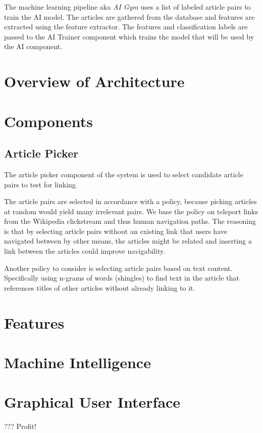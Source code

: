 The machine learning pipeline aka \textit{AI Gym\texttrademark} uses a list of labeled article pairs to train the AI model. The articles are gathered from the database and features are extracted using the feature extractor. The features and classification labels are passed to the AI Trainer component which trains the model that will be used by the AI component.


\section{Overview of Architecture}\label{sec:architecture}

\section{Components}

\subsection{Article Picker}
The article picker component of the system is used to select candidate article pairs to test for linking.

The article pairs are selected in accordance with a policy, because picking articles at random would yield many irrelevant pairs. We base the policy on teleport links from the Wikipedia clickstream and thus human navigation paths. The reasoning is that by selecting article pairs without an existing link that users have navigated between by other means, the articles might be related and inserting a link between the articles could improve navigability.

Another policy to consider is selecting article pairs based on text content. Specifically using n-grams of words (shingles) to find text in the article that references titles of other articles without already linking to it. 


\section{Features}

\section{Machine Intelligence}

\section{Graphical User Interface}
??? Profit!